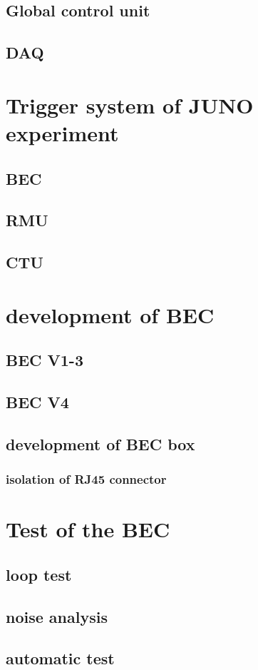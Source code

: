 \documentclass[a4paper,english,12pt]{memoir}
\begin{document}
\section{Global control unit}
\section{DAQ}
\chapter{Trigger system of JUNO experiment}
\section{BEC}
\section{RMU}
\section{CTU}
\chapter{development of BEC}
\section{BEC V1-3}
\section{BEC V4}
\section{development of BEC box}
\subsection{isolation of RJ45 connector}
\chapter{Test of the BEC}
\section{loop test}
\section{noise analysis}
\section{automatic test}
\end{document}

